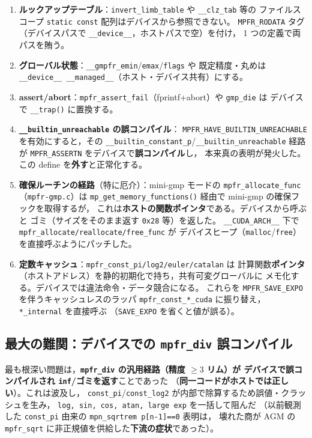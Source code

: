 \documentclass[uplatex,dvipdfmx,a4paper,11pt]{jsarticle}
\newcommand{\code}[1]{\texttt{#1}}
\begin{document}
\begin{enumerate}
\item \textbf{ルックアップテーブル}：\code{invert\_limb\_table} や \code{\_\_clz\_tab} 等の
      ファイルスコープ \code{static const} 配列はデバイスから参照できない。
      \code{MPFR\_RODATA} タグ（デバイスパスで \code{\_\_device\_\_}，ホストパスで空）を付け，
      1 つの定義で両パスを賄う。
\item \textbf{グローバル状態}：\code{\_\_gmpfr\_emin}/\code{emax}/\code{flags} や
      既定精度・丸めは \code{\_\_device\_\_ \_\_managed\_\_}（ホスト・デバイス共有）にする。
\item \textbf{assert/abort}：\code{mpfr\_assert\_fail}（fprintf+abort）や \code{gmp\_die} は
      デバイスで \code{\_\_trap()} に置換する。
\item \textbf{\code{\_\_builtin\_unreachable} の誤コンパイル}：
      \code{MPFR\_HAVE\_BUILTIN\_UNREACHABLE} を有効にすると，その
      \code{\_\_builtin\_constant\_p}/\code{\_\_builtin\_unreachable} 経路が
      \code{MPFR\_ASSERTN} をデバイスで\textbf{誤コンパイル}し，
      本来真の表明が発火した。この define を\textbf{外す}と正常化する。
\item \textbf{確保ルーチンの経路}（特に厄介）：mini-gmp モードの
      \code{mpfr\_allocate\_func}（\code{mpfr-gmp.c}）は
      \code{mp\_get\_memory\_functions()} 経由で mini-gmp の確保フックを取得するが，
      これは\textbf{ホストの関数ポインタ}である。デバイスから呼ぶと
      ゴミ（サイズをそのまま返す \code{0x28} 等）を返した。
      \code{\_\_CUDA\_ARCH\_\_} 下で \code{mpfr\_allocate/reallocate/free\_func} が
      デバイスヒープ（\code{malloc}/\code{free}）を直接呼ぶようにパッチした。
\item \textbf{定数キャッシュ}：\code{mpfr\_const\_pi/log2/euler/catalan} は
      計算関数\textbf{ポインタ}（ホストアドレス）を静的初期化で持ち，共有可変グローバルに
      メモ化する。デバイスでは違法命令・データ競合になる。
      これらを \code{MPFR\_SAVE\_EXPO} を伴うキャッシュレスのラッパ
      \code{mpfr\_const\_*\_cuda} に振り替え，\code{*\_internal} を直接呼ぶ
      （\code{SAVE\_EXPO} を省くと値が誤る）。
\end{enumerate}

\subsection{最大の難関：デバイスでの \code{mpfr\_div} 誤コンパイル}

最も根深い問題は，\textbf{\code{mpfr\_div} の汎用経路（精度 $\ge 3$ リム）が
デバイスで誤コンパイルされ \code{inf}/ゴミを返す}ことであった
（\textbf{同一コードがホストでは正しい}）。これは波及し，
\code{const\_pi}/\code{const\_log2} が内部で除算するため誤値・クラッシュを生み，
\code{log, sin, cos, atan, large exp} を一括して阻んだ
（以前観測した \code{const\_pi} 由来の \code{mpn\_sqrtrem p[n-1]==0} 表明は，
壊れた商が AGM の \code{mpfr\_sqrt} に非正規値を供給した\textbf{下流の症状}であった）。
\end{document}
